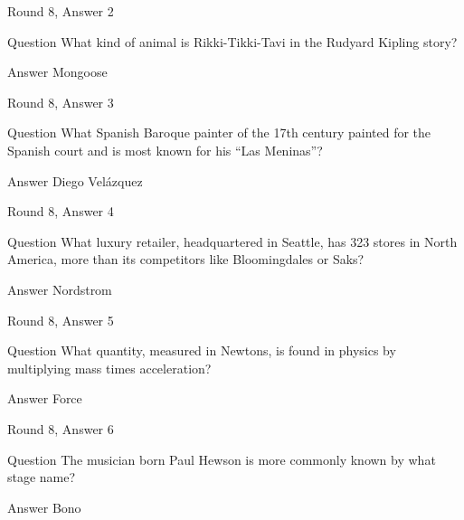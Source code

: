 \documentclass[11pt]{beamer}
\begin{document}
\begin{frame}[t]{Round 8, Answer 2}
\vspace{2em}
\begin{block}{Question}
What kind of animal is Rikki-Tikki-Tavi in the Rudyard Kipling story\@?
\end{block}
\pause{}
\begin{block}{Answer}
Mongoose
\end{block}
\end{frame}
    

\begin{frame}[t]{Round 8, Answer 3}
\vspace{2em}
\begin{block}{Question}
What Spanish Baroque painter of the 17th century painted for the Spanish court and is most known for his ``Las Meninas''\@?
\end{block}
\pause{}
\begin{block}{Answer}
Diego Velázquez
\end{block}
\end{frame}
    

\begin{frame}[t]{Round 8, Answer 4}
\vspace{2em}
\begin{block}{Question}
What luxury retailer, headquartered in Seattle, has 323 stores in North America, more than its competitors like Bloomingdales or Saks\@?
\end{block}
\pause{}
\begin{block}{Answer}
Nordstrom
\end{block}
\end{frame}
    

\begin{frame}[t]{Round 8, Answer 5}
\vspace{2em}
\begin{block}{Question}
What quantity, measured in Newtons, is found in physics by multiplying mass times acceleration\@?
\end{block}
\pause{}
\begin{block}{Answer}
Force
\end{block}
\end{frame}
    

\begin{frame}[t]{Round 8, Answer 6}
\vspace{2em}
\begin{block}{Question}
The musician born Paul Hewson is more commonly known by what stage name\@?
\end{block}
\pause{}
\begin{block}{Answer}
Bono
\end{block}
\end{frame}
    
\end{document}
